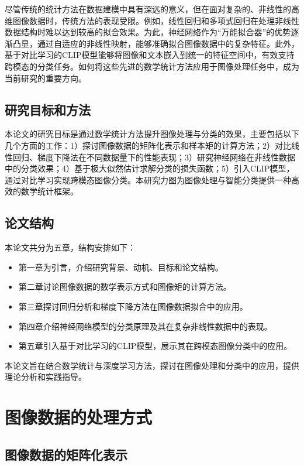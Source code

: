 \documentclass[
    report,     %
    oneside,    %
    UTF8,       %
    zihao=-4    %
]{config} %
\begin{document}
尽管传统的统计方法在数据建模中具有深远的意义，但在面对复杂的、非线性的高维图像数据时，传统方法的表现受限。例如，线性回归和多项式回归在处理非线性数据结构时难以达到较高的拟合效果。为此，神经网络作为“万能拟合器”的优势逐渐凸显，通过自适应的非线性映射，能够准确拟合图像数据中的复杂特征。此外，基于对比学习的CLIP\cite{clip}模型能够将图像和文本嵌入到统一的特征空间中，有效支持跨模态的分类任务。如何将这些先进的数学统计方法应用于图像处理任务中，成为当前研究的重要方向。

\section{研究目标和方法}

本论文的研究目标是通过数学统计方法提升图像处理与分类的效果，主要包括以下几个方面的工作：1）探讨图像数据的矩阵化表示和样本矩的计算方法；2）对比线性回归、梯度下降法在不同数据量下的性能表现；3）研究神经网络在非线性数据中的分类效果；4）基于极大似然估计求解分类的损失函数；5）引入CLIP\cite{clip}模型，通过对比学习实现跨模态图像分类。本研究力图为图像处理与智能分类提供一种高效的数学统计框架。

\section{论文结构}

本论文共分为五章，结构安排如下：
\begin{itemize}
    \item 第一章为引言，介绍研究背景、动机、目标和论文结构。
    \item 第二章讨论图像数据的数学表示方式和图像矩的计算方法。
    \item 第三章探讨回归分析和梯度下降方法在图像数据拟合中的应用。
    \item 第四章介绍神经网络模型的分类原理及其在复杂非线性数据中的表现。
    \item 第五章引入基于对比学习的CLIP模型，展示其在跨模态图像分类中的应用。
\end{itemize}

本论文旨在结合数学统计与深度学习方法，探讨在图像处理和分类中的应用，提供理论分析和实践指导。


\chapter{图像数据的处理方式}

\section{图像数据的矩阵化表示}
\end{document}
